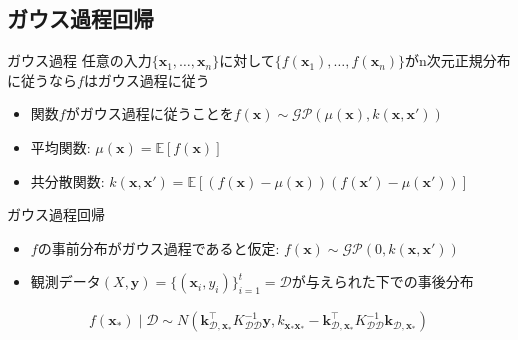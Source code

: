 \documentclass[dvipdfmx, 10.5pt]{beamer}
\begin{document}
\subsection{ガウス過程回帰}
\begin{frame}{\insertsubsection}
	\begin{block}{ガウス過程}
		任意の入力$\{ \bm x_1, \ldots, \bm x_n \}$に対して$\{f(\bm x_1), \ldots, f(\bm x_n)\}$がn次元正規分布に従うなら$f$はガウス過程に従う
	\end{block}

\begin{itemize}
	\item 関数$f$がガウス過程に従うことを$f(\bm x) \sim \mathcal{GP}(\mu(\bm x), k(\bm x, \bm x'))$
	\item 平均関数: $\mu(\bm x) = \mathbb{E}[f(\bm x)]$
	\item 共分散関数: $k(\bm x, \bm x') = \mathbb{E}[(f(\bm x) - \mu(\bm x))(f(\bm x') - \mu(\bm x'))]$
\end{itemize}
\begin{block}{ガウス過程回帰}
	\begin{itemize}
		\item $f$の事前分布がガウス過程であると仮定: $f(\bm x) \sim \mathcal{GP}( 0, k(\bm x, \bm x'))$
		\item 観測データ$(X, \bm y) = \{(\bm x_i, y_i)\}_{i = 1}^t = \mathcal{D}$が与えられた下での事後分布
	\end{itemize}
	\vspace{-0.2cm}
	\begin{align*}
		f({\bm x}_\ast) \mid \mathcal{D}
			\sim
			N \left(
			\bm k_{\mathcal{D}, {\bm x}_\ast   }^\top
			K_{\mathcal{D} \mathcal{D}}^{-1}
			{\bm y},%
			k_{{\bm x}_\ast {\bm x}_\ast}
			-
			\bm k_{\mathcal{D} , {\bm x}_\ast}^\top
			K_{\mathcal{D} \mathcal{D}}^{-1}
			\bm k_{\mathcal{D} , {\bm x}_\ast}%
			\right)
	\end{align*}
	\vspace{-1cm}


\end{block}
\end{frame}
\end{document}
